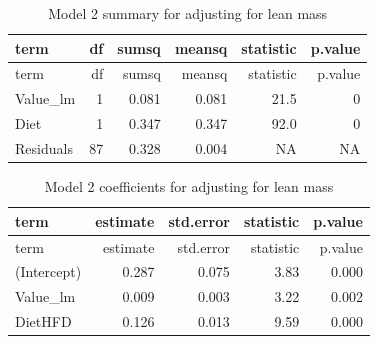 \documentclass[]{article}
\newenvironment{Shaded}{\begin{snugshade}}{\end{snugshade}}
\newcommand{\DataTypeTok}[1]{\textcolor[rgb]{0.13,0.29,0.53}{#1}}
\newcommand{\FloatTok}[1]{\textcolor[rgb]{0.00,0.00,0.81}{#1}}
\newcommand{\KeywordTok}[1]{\textcolor[rgb]{0.13,0.29,0.53}{\textbf{#1}}}
\newcommand{\NormalTok}[1]{#1}
\newcommand{\OperatorTok}[1]{\textcolor[rgb]{0.81,0.36,0.00}{\textbf{#1}}}
\newcommand{\StringTok}[1]{\textcolor[rgb]{0.31,0.60,0.02}{#1}}
\begin{document}
\begin{Shaded}
\end{Shaded}

\begin{longtable}[]{@{}lrrrrr@{}}
\caption{Model 2 summary for adjusting for lean mass}\tabularnewline
\toprule
term & df & sumsq & meansq & statistic & p.value\tabularnewline
\midrule
\endfirsthead
\toprule
term & df & sumsq & meansq & statistic & p.value\tabularnewline
\midrule
\endhead
Value\_lm & 1 & 0.081 & 0.081 & 21.5 & 0\tabularnewline
Diet & 1 & 0.347 & 0.347 & 92.0 & 0\tabularnewline
Residuals & 87 & 0.328 & 0.004 & NA & NA\tabularnewline
\bottomrule
\end{longtable}

\begin{Shaded}
\end{Shaded}

\begin{longtable}[]{@{}lrrrr@{}}
\caption{Model 2 coefficients for adjusting for lean
mass}\tabularnewline
\toprule
term & estimate & std.error & statistic & p.value\tabularnewline
\midrule
\endfirsthead
\toprule
term & estimate & std.error & statistic & p.value\tabularnewline
\midrule
\endhead
(Intercept) & 0.287 & 0.075 & 3.83 & 0.000\tabularnewline
Value\_lm & 0.009 & 0.003 & 3.22 & 0.002\tabularnewline
DietHFD & 0.126 & 0.013 & 9.59 & 0.000\tabularnewline
\bottomrule
\end{longtable}
\end{document}
